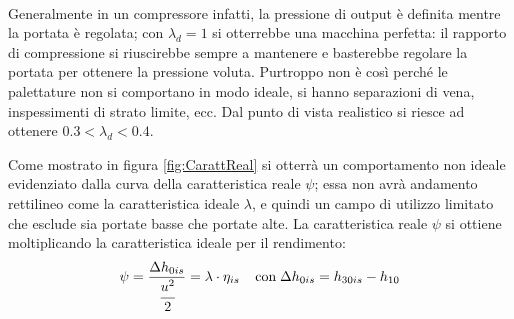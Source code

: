 \\Generalmente in un compressore infatti, la pressione di output è definita mentre la portata è regolata; con $\lambda_d = 1$ si otterrebbe una macchina perfetta: il rapporto di compressione si riuscirebbe sempre a mantenere e basterebbe regolare la portata per ottenere la pressione voluta. Purtroppo non è così perché le palettature non si comportano in modo ideale, si hanno separazioni di vena, inspessimenti di strato limite, ecc. Dal punto di vista realistico si riesce ad ottenere $0.3<\lambda_d<0.4$.

Come mostrato in figura \ref{fig:CarattReal} si otterrà un comportamento non ideale evidenziato dalla curva della caratteristica reale $\psi$; essa non avrà andamento rettilineo come la caratteristica ideale $\lambda$, e quindi un campo di utilizzo limitato che esclude sia portate basse che portate alte. La caratteristica reale $\psi$ si ottiene moltiplicando la caratteristica ideale per il rendimento:
\begin{equation}
\psi = \frac{\Delta h_{0is}}{\cfrac{u^2}{2}} = \lambda \cdot \eta_{is} \;\;\;\; \text{con}\; \Delta h_{0is} = h_{30is} - h_{10}
\end{equation}

